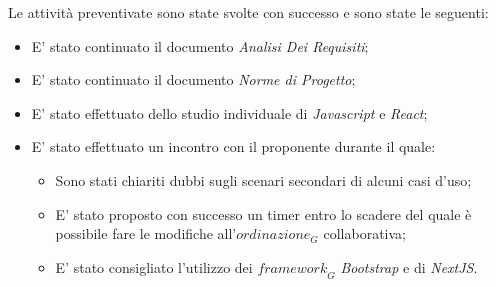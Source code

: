 Le attività preventivate sono state svolte con successo e sono state le seguenti:
\begin{itemize}
    \item E' stato continuato il documento \emph{Analisi Dei Requisiti};
    \item E' stato continuato il documento \emph{Norme di Progetto};
    \item E' stato effettuato dello studio individuale di \emph{Javascript} e \emph{React};
    \item E' stato effettuato un incontro con il proponente durante il quale:
    \begin{itemize}
        \item Sono stati chiariti dubbi sugli scenari secondari di alcuni casi d'uso;
        \item E' stato proposto con successo un timer entro lo scadere del quale è possibile fare le modifiche all'$\textit{ordinazione}_G$ collaborativa;
        \item E' stato consigliato l'utilizzo dei $\textit{framework}_G$ \emph{Bootstrap} e di \emph{NextJS}.
    \end{itemize}
\end{itemize}
